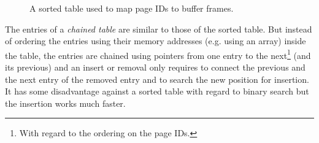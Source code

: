 \begin{@empty}

	\begin{figure}[ht!]
		\centering
		\caption{A sorted table used to map page IDs to buffer frames.}
		\label{fig:sortedTable}
	\end{figure}
\end{@empty}
	
	The entries of a \emph{chained table} are similar to those of the sorted table. But instead of ordering the entries using their memory addresses (e.g. using an array) inside the table, the entries are chained using pointers from one entry to the next\footnote[1]{With regard to the ordering on the page IDs.} (and its previous) and an insert or removal only requires to connect the previous and the next entry of the removed entry and to search the new position for insertion. It has some disadvantage against a sorted table with regard to binary search but the insertion works much faster.

